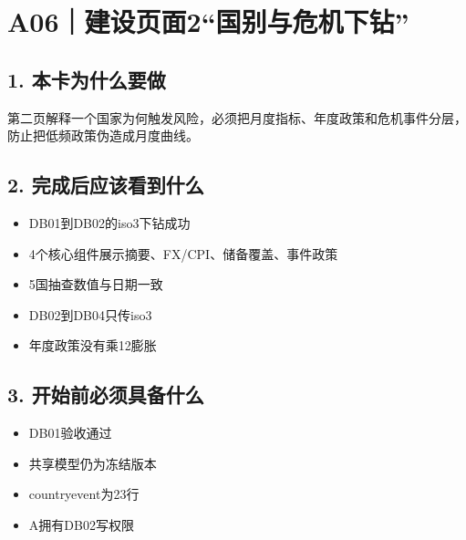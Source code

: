 \documentclass[UTF8,openany,zihao=-4]{ctexbook}
\renewcommand{\_}{\textunderscore\allowbreak}
\begin{document}
\clearpage
\section{A06｜建设页面2“国别与危机下钻”}
\subsection*{1. 本卡为什么要做}
第二页解释一个国家为何触发风险，必须把月度指标、年度政策和危机事件分层，防止把低频政策伪造成月度曲线。


\subsection*{2. 完成后应该看到什么}
\begin{itemize}
\item DB01到DB02的iso3下钻成功
\item 4个核心组件展示摘要、FX/CPI、储备覆盖、事件政策
\item 5国抽查数值与日期一致
\item DB02到DB04只传iso3
\item 年度政策没有乘12膨胀
\end{itemize}

\subsection*{3. 开始前必须具备什么}
\begin{itemize}[label=$\square$]
\item DB01验收通过
\item 共享模型仍为冻结版本
\item country\_event为23行
\item A拥有DB02写权限
\end{itemize}
\end{document}
